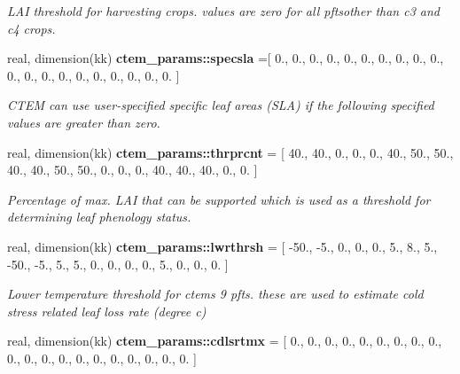 \begin{DoxyCompactItemize}
\begin{DoxyCompactList}\small\item\em L\+A\+I threshold for harvesting crops. values are zero for all pftsother than c3 and c4 crops. \end{DoxyCompactList}\item 
\hypertarget{namespacectem__params_adc0f8a65d365deb6112b767066c25929}{}real, dimension(kk) {\bfseries ctem\+\_\+params\+::specsla} =\mbox{[} 0., 0., 0., 0., 0., 0., 0., 0., 0., 0., 0., 0., 0., 0., 0., 0., 0., 0., 0., 0. \mbox{]}\label{namespacectem__params_adc0f8a65d365deb6112b767066c25929}

\begin{DoxyCompactList}\small\item\em C\+T\+E\+M can use user-\/specified specific leaf areas (S\+L\+A) if the following specified values are greater than zero. \end{DoxyCompactList}\item 
\hypertarget{namespacectem__params_af5b1d396f621af177ae9b6011942df1c}{}real, dimension(kk) {\bfseries ctem\+\_\+params\+::thrprcnt} = \mbox{[} 40., 40., 0., 0., 0., 40., 50., 50., 40., 40., 50., 50., 0., 0., 0., 40., 40., 40., 0., 0. \mbox{]}\label{namespacectem__params_af5b1d396f621af177ae9b6011942df1c}

\begin{DoxyCompactList}\small\item\em Percentage of max. L\+A\+I that can be supported which is used as a threshold for determining leaf phenology status. \end{DoxyCompactList}\item 
\hypertarget{namespacectem__params_abef1f9707a8519b0dd657de37edc26b1}{}real, dimension(kk) {\bfseries ctem\+\_\+params\+::lwrthrsh} = \mbox{[} -\/50., -\/5., 0., 0., 0., 5., 8., 5., -\/50., -\/5., 5., 5., 0., 0., 0., 0., 5., 0., 0., 0. \mbox{]}\label{namespacectem__params_abef1f9707a8519b0dd657de37edc26b1}

\begin{DoxyCompactList}\small\item\em Lower temperature threshold for ctem\textquotesingle{}s 9 pfts. these are used to estimate cold stress related leaf loss rate (degree c) \end{DoxyCompactList}\item 
\hypertarget{namespacectem__params_a22b7dcf204415799531485f3e75e91a9}{}real, dimension(kk) {\bfseries ctem\+\_\+params\+::cdlsrtmx} = \mbox{[} 0., 0., 0., 0., 0., 0., 0., 0., 0., 0., 0., 0., 0., 0., 0., 0., 0., 0., 0., 0. \mbox{]}\label{namespacectem__params_a22b7dcf204415799531485f3e75e91a9}


\end{DoxyCompactItemize}
